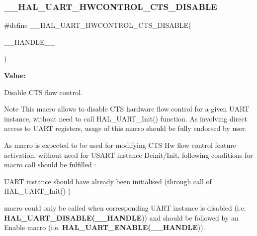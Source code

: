 \subsubsection{\texorpdfstring{\_\_HAL\_UART\_HWCONTROL\_CTS\_DISABLE}{\_\_HAL\_UART\_HWCONTROL\_CTS\_DISABLE}}
{\footnotesize\ttfamily \#define \+\_\+\+\_\+\+H\+A\+L\+\_\+\+U\+A\+R\+T\+\_\+\+H\+W\+C\+O\+N\+T\+R\+O\+L\+\_\+\+C\+T\+S\+\_\+\+D\+I\+S\+A\+B\+LE(\begin{DoxyParamCaption}\item[{}]{\+\_\+\+\_\+\+H\+A\+N\+D\+L\+E\+\_\+\+\_\+ }\end{DoxyParamCaption})}

{\bfseries Value\+:}
\begin{DoxyCode}{0}
\DoxyCodeLine{\textcolor{keywordflow}{do}\{                                                       \(\backslash\)}

\end{DoxyCode}


Disable C\+TS flow control. 

\begin{DoxyNote}{Note}
This macro allows to disable C\+TS hardware flow control for a given U\+A\+RT instance, without need to call H\+A\+L\+\_\+\+U\+A\+R\+T\+\_\+\+Init() function. As involving direct access to U\+A\+RT registers, usage of this macro should be fully endorsed by user. 

As macro is expected to be used for modifying C\+TS Hw flow control feature activation, without need for U\+S\+A\+RT instance Deinit/\+Init, following conditions for macro call should be fulfilled \+:
\begin{DoxyItemize}
\item U\+A\+RT instance should have already been initialised (through call of H\+A\+L\+\_\+\+U\+A\+R\+T\+\_\+\+Init() )
\item macro could only be called when corresponding U\+A\+RT instance is disabled (i.\+e. {\bfseries{H\+A\+L\+\_\+\+U\+A\+R\+T\+\_\+\+D\+I\+S\+A\+B\+LE(\+\_\+\+\_\+\+H\+A\+N\+D\+LE}})) and should be followed by an Enable macro (i.\+e. {\bfseries{H\+A\+L\+\_\+\+U\+A\+R\+T\+\_\+\+E\+N\+A\+B\+LE(\+\_\+\+\_\+\+H\+A\+N\+D\+LE}})). 
\end{DoxyItemize}
\end{DoxyNote}

